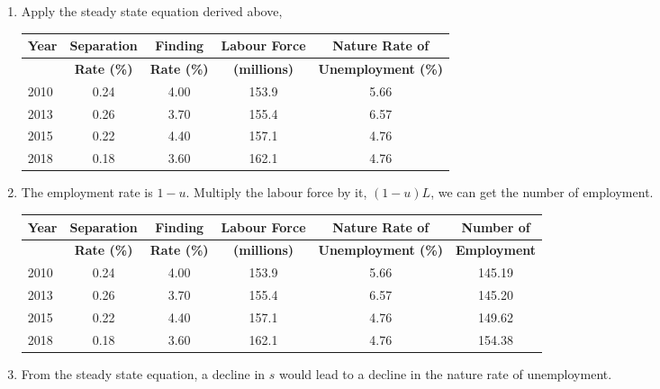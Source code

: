 \documentclass[addpoints,12pt,answers]{exam}
\begin{document}
\begin{enumerate}[label=\textbf{\arabic*.}, itemsep=15pt]
\begin{enumerate}[label=(\alph*)]
			\item Apply the steady state equation derived above, 
		\begin{table}[htbp]
			\centering
			\begin{tabular}{lcccc}
				\toprule
				\textbf{Year} & \textbf{Separation} & \textbf{Finding } & \textbf{Labour Force} & \textbf{Nature Rate of } \\
				\midrule
				& \textbf{ Rate (\%)} & \textbf{Rate (\%)} & \textbf{ (millions)} & \textbf{Unemployment (\%)} \\
				\midrule
				2010  & 0.24  & 4.00  & 153.9 & 5.66 \\
				2013  & 0.26  & 3.70  & 155.4 & 6.57 \\
				2015  & 0.22  & 4.40  & 157.1 & 4.76 \\
				2018  & 0.18  & 3.60  & 162.1 & 4.76 \\
				\bottomrule
			\end{tabular}%
			\label{tab:addlabel}%
		\end{table}%
		
			
			\item 
			The employment rate is $1-u$. Multiply the labour force by it, $(1-u)L$, we can get the number of employment.
			
			\begin{table}[htbp]
				\centering
				\begin{tabular}{lccccc}
					\toprule
					\textbf{Year} & \textbf{Separation} & \textbf{Finding } & \textbf{Labour Force} & \textbf{Nature Rate of } & \textbf{Number of } \\
					\midrule
					& \textbf{ Rate (\%)} & \textbf{Rate (\%)} & \textbf{ (millions)} & \textbf{Unemployment (\%)} & \textbf{Employment} \\
					\midrule
					2010  & 0.24  & 4.00  & 153.9 & 5.66  & 145.19 \\
					2013  & 0.26  & 3.70  & 155.4 & 6.57  & 145.20 \\
					2015  & 0.22  & 4.40  & 157.1 & 4.76  & 149.62 \\
					2018  & 0.18  & 3.60  & 162.1 & 4.76  & 154.38 \\
					\bottomrule
				\end{tabular}%
			\end{table}%
			
			
			\item 	From the steady state equation, a decline in $s$ would lead to a decline in the nature rate of unemployment. 
			

\end{enumerate}
\end{enumerate}
\end{document}
